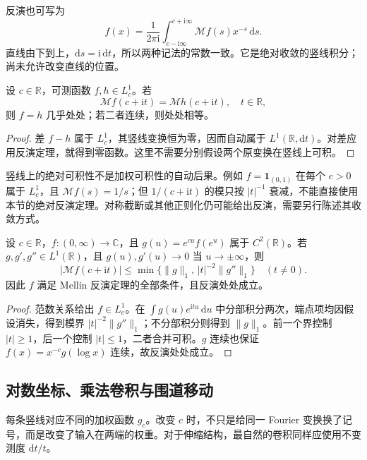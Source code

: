 反演也可写为
\[
 f(x)=\frac1{2\pi\mathrm i}
       \int_{c-\mathrm i\infty}^{c+\mathrm i\infty}\mathcal Mf(s)x^{-s}\,\mathrm ds.
\]
直线由下到上，\(\mathrm ds=\mathrm i\,\mathrm dt\)，所以两种记法的常数一致。它是绝对收敛的竖线积分；尚未允许改变直线的位置。

\begin{corollary}[一条竖线上的唯一性]\label{b3:cor:21-mellin-uniqueness}
设 \(c\in\mathbb R\)，可测函数 \(f,h\in L^1_c\)。若
\[
 \mathcal Mf(c+\mathrm it)=\mathcal Mh(c+\mathrm it),\quad t\in\mathbb R,
\]
则 \(f=h\) 几乎处处；若二者连续，则处处相等。
\end{corollary}
\begin{proof}
差 \(f-h\) 属于 \(L^1_c\)，其竖线变换恒为零，因而自动属于 \(L^1(\mathbb R,\mathrm dt)\)。对差应用反演定理，就得到零函数。这里不需要分别假设两个原变换在竖线上可积。
\end{proof}

竖线上的绝对可积性不是加权可积性的自动后果。例如 \(f=\mathbf1_{(0,1)}\) 在每个 \(c>0\) 属于 \(L^1_c\)，且 \(\mathcal Mf(s)=1/s\)；但 \(1/(c+\mathrm it)\) 的模只按 \(|t|^{-1}\) 衰减，不能直接使用本节的绝对反演定理。对称截断或其他正则化仍可能给出反演，需要另行陈述其收敛方式。

\begin{proposition}[绝对反演的一个充分条件]\label{b3:prop:21-mellin-inversion-test}
设 \(c\in\mathbb R\)，\(f:(0,\infty)\to\mathbb C\)，且 \(g(u)=e^{cu}f(e^u)\) 属于 \(C^2(\mathbb R)\)。若 \(g,g',g''\in L^1(\mathbb R)\)，且 \(g(u),g'(u)\to0\) 当 \(u\to\pm\infty\)，则
\[
 |\mathcal Mf(c+\mathrm it)|
 \le\min\{\|g\|_1,\,|t|^{-2}\|g''\|_1\}\quad(t\ne0).
\]
因此 \(f\) 满足 Mellin 反演定理的全部条件，且反演处处成立。
\end{proposition}
\begin{proof}
范数关系给出 \(f\in L^1_c\)。在 \(\int g(u)e^{\mathrm itu}\,\mathrm du\) 中分部积分两次，端点项均因假设消失，得到模界 \(|t|^{-2}\|g''\|_1\)；不分部积分则得到 \(\|g\|_1\)。前一个界控制 \(|t|\ge1\)，后一个控制 \(|t|\le1\)，二者合并可积。\(g\) 连续也保证 \(f(x)=x^{-c}g(\log x)\) 连续，故反演处处成立。
\end{proof}

\subsection{对数坐标、乘法卷积与围道移动}
\label{b3:subsec:210505}

每条竖线对应不同的加权函数 \(g_c\)。改变 \(c\) 时，不只是给同一 Fourier 变换换了记号，而是改变了输入在两端的权重。对于伸缩结构，最自然的卷积同样应使用不变测度 \(\mathrm dt/t\)。

